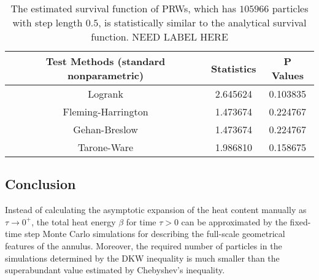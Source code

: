 \begin{table}
  \centering
  \begin{tabular}{|c|c|c|}\hline
    Test Methods (standard nonparametric) & Statistics & P Values \\
    \hline
    Logrank & 2.645624 & 0.103835 \\
    \hline
    Fleming-Harrington & 1.473674 & 0.224767 \\
    \hline
    Gehan-Breslow & 1.473674 & 0.224767 \\
    \hline
    Tarone-Ware & 1.986810 & 0.158675 \\
    \hline
  \end{tabular}
  \caption{The estimated survival function of PRWs, which has
    $105966$ particles with step length $0.5$, is statistically
    similar to the analytical survival function. NEED LABEL HERE}
\end{table}


\subsection{Conclusion}


Instead of calculating the asymptotic expansion of the heat content
manually as $\tau \rightarrow 0^+$, the total heat energy $\beta$
\cite{gilkey1994heat} for time $\tau > 0$ can be approximated by the
fixed-time step Monte Carlo simulations for describing the full-scale
geometrical features of the annulus. Moreover, the required number of
particles in the simulations determined by the DKW inequality is much
smaller than the superabundant value estimated by Chebyshev’s
inequality. 
